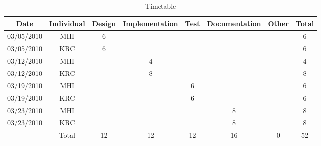 \begin{center}
\begin{table}
\begin{tabular}{c|c|c|c|c|c|c|c}
Date & Individual & Design & Implementation & Test & Documentation & Other & Total\tabularnewline
\hline
\hline 
03/05/2010 & MHI & 6 &  &  &  &  & 6\tabularnewline
\hline 
03/05/2010 & KRC & 6 &  &  &  &  & 6\tabularnewline
\hline 
03/12/2010 & MHI &  & 4 &  &  &  & 4\tabularnewline
\hline 
03/12/2010 & KRC &  & 8 &  &  &  & 8\tabularnewline
\hline 
03/19/2010 & MHI &  &  & 6 &  &  & 6\tabularnewline
\hline 
03/19/2010 & KRC &  &  & 6 &  &  & 6\tabularnewline
\hline 
03/23/2010 & MHI &  &  &  & 8 &  & 8\tabularnewline
\hline 
03/23/2010 & KRC &  &  &  & 8 &  & 8\tabularnewline
\hline
\hline 
 & Total & 12 & 12 & 12 & 16 & 0 & 52\tabularnewline
\cline{2-8} 
\end{tabular}
\caption{Timetable \label{table:timetable} }
\end{table}
\end{center}